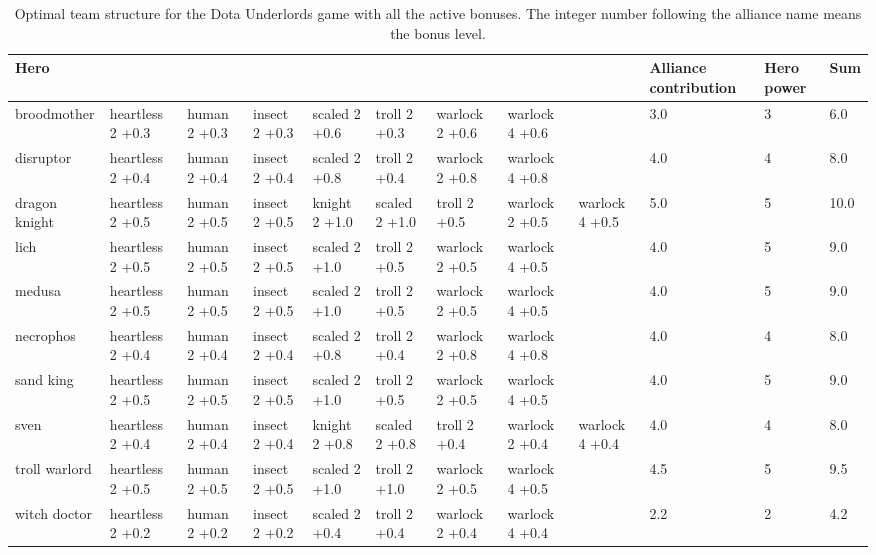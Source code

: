 \documentclass[smallextended]{svjour3}       %
\begin{document}
\begin{table}
\resizebox{16cm}{!} {
\begin{tabular}{l| *{8}{p{1.6cm}} | *{3}{ p{1cm}} }
{Hero} &                   &               &                &                &                &                  &                  &                  &  Alliance contribution &  Hero power &   Sum \\
\midrule
broodmother   &  heartless 2 +0.3  &  human 2 +0.3  &  insect 2 +0.3  &  scaled 2 +0.6  &   troll 2 +0.3  &  warlock  2 +0.6  &  warlock  4 +0.6  &                   &                  3.0 &           3 &   6.0 \\
disruptor     &  heartless 2 +0.4  &  human 2 +0.4  &  insect 2 +0.4  &  scaled 2 +0.8  &   troll 2 +0.4  &  warlock  2 +0.8  &  warlock  4 +0.8  &                   &                  4.0 &           4 &   8.0 \\
dragon knight &  heartless 2 +0.5  &  human 2 +0.5  &  insect 2 +0.5  &  knight 2 +1.0  &  scaled 2 +1.0  &     troll 2 +0.5  &  warlock  2 +0.5  &  warlock  4 +0.5  &                  5.0 &           5 &  10.0 \\
lich          &  heartless 2 +0.5  &  human 2 +0.5  &  insect 2 +0.5  &  scaled 2 +1.0  &   troll 2 +0.5  &  warlock  2 +0.5  &  warlock  4 +0.5  &                   &                  4.0 &           5 &   9.0 \\
medusa        &  heartless 2 +0.5  &  human 2 +0.5  &  insect 2 +0.5  &  scaled 2 +1.0  &   troll 2 +0.5  &  warlock  2 +0.5  &  warlock  4 +0.5  &                   &                  4.0 &           5 &   9.0 \\
necrophos     &  heartless 2 +0.4  &  human 2 +0.4  &  insect 2 +0.4  &  scaled 2 +0.8  &   troll 2 +0.4  &  warlock  2 +0.8  &  warlock  4 +0.8  &                   &                  4.0 &           4 &   8.0 \\
sand king     &  heartless 2 +0.5  &  human 2 +0.5  &  insect 2 +0.5  &  scaled 2 +1.0  &   troll 2 +0.5  &  warlock  2 +0.5  &  warlock  4 +0.5  &                   &                  4.0 &           5 &   9.0 \\
sven          &  heartless 2 +0.4  &  human 2 +0.4  &  insect 2 +0.4  &  knight 2 +0.8  &  scaled 2 +0.8  &     troll 2 +0.4  &  warlock  2 +0.4  &  warlock  4 +0.4  &                  4.0 &           4 &   8.0 \\
troll warlord &  heartless 2 +0.5  &  human 2 +0.5  &  insect 2 +0.5  &  scaled 2 +1.0  &   troll 2 +1.0  &  warlock  2 +0.5  &  warlock  4 +0.5  &                   &                  4.5 &           5 &   9.5 \\
witch doctor  &  heartless 2 +0.2  &  human 2 +0.2  &  insect 2 +0.2  &  scaled 2 +0.4  &   troll 2 +0.4  &  warlock  2 +0.4  &  warlock  4 +0.4  &                   &                  2.2 &           2 &   4.2 \\
\bottomrule
\end{tabular}
}
\caption{Optimal team structure for the Dota Underlords game with all the active bonuses. The integer number following the alliance name means the bonus level.}
\label{table:solution}
\end{table}
\end{document}
